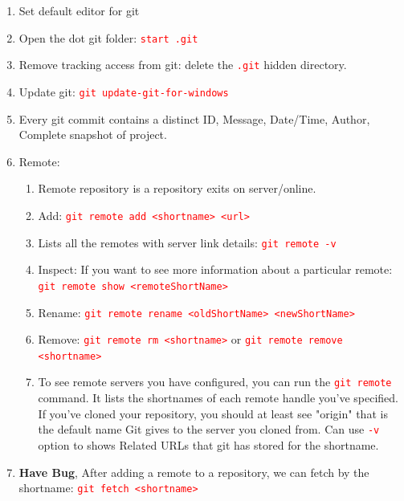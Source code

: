 \documentclass[12 pt, letterpaper]{extarticle}
\newcommand{\R}{\textcolor{red}} %
\newcommand{\T}{\texttt}
\begin{document}
\begin{enumerate}
	\item Set default editor for git
	\item Open the dot git folder: \R{\T{start .git}}
	\item Remove tracking access from git: delete the \R{\T{.git}} hidden directory.

	\item Update git: \R{\T{git update-git-for-windows}}
	\item Every git commit contains a distinct ID, Message, Date/Time, Author, Complete snapshot of project.

	\item Remote:
	      \begin{enumerate}
		      \item Remote repository is a repository exits on server/online.
		      \item Add: \R{\T{git remote add <shortname> <url>}}
		      \item Lists all the remotes with server link details: \R{\T{git remote -v}}
		      \item Inspect: If you want to see more information about a particular remote: \R{\T{git remote show <remoteShortName>}}
		      \item Rename: \R{\T{git remote rename <oldShortName> <newShortName>}}
		      \item Remove: \R{\T{git remote rm <shortname>}} or \R{\T{git remote remove <shortname>}}
		      \item To see remote servers you have configured, you can run the \R{\T{git remote}} command. It lists the shortnames of each remote handle you've specified. If you've cloned your repository, you should at least see "origin" that is the default name Git gives to the server you cloned from. Can use \R{\T{-v}} option to shows Related URLs that git has stored for the shortname.
	      \end{enumerate}

	\item \textbf{Have Bug}, After adding a remote to a repository, we can fetch by the shortname: \R{\T{git fetch <shortname>}}


\end{enumerate}
\end{document}
